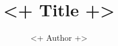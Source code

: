 \documentclass[a4paper,11pt,english]{article}
\title{\textbf{<+ Title +>}}
\author{<+ Author +>}
\begin{document}
\mmaketitle
\end{document}

